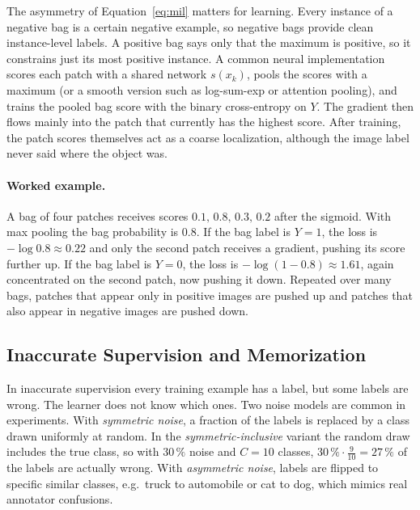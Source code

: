 \noindent
The asymmetry of Equation~\ref{eq:mil} matters for learning. Every instance
of a negative bag is a certain negative example, so negative bags provide
clean instance-level labels. A positive bag says only that the maximum is
positive, so it constrains just its most positive instance. A common neural
implementation scores each patch with a shared network $s(x_k)$, pools the
scores with a maximum (or a smooth version such as log-sum-exp or attention
pooling), and trains the pooled bag score with the binary cross-entropy on
$Y$. The gradient then flows mainly into the patch that currently has the
highest score. After training, the patch scores themselves act as a coarse
localization, although the image label never said where the object was.

\paragraph{Worked example.}
A bag of four patches receives scores $0.1,\,0.8,\,0.3,\,0.2$ after the
sigmoid. With max pooling the bag probability is $0.8$. If the bag label is
$Y=1$, the loss is $-\log0.8\approx0.22$ and only the second patch receives a
gradient, pushing its score further up. If the bag label is $Y=0$, the loss
is $-\log(1-0.8)\approx1.61$, again concentrated on the second patch, now
pushing it down. Repeated over many bags, patches that appear only in positive
images are pushed up and patches that also appear in negative images are
pushed down.

\subsection{Inaccurate Supervision and Memorization}

In inaccurate supervision every training example has a label, but some
labels are wrong. The learner does not know which ones. Two noise models are
common in experiments. With \emph{symmetric noise}, a fraction of the labels
is replaced by a class drawn uniformly at random. In the
\emph{symmetric-inclusive} variant the random draw includes the true class,
so with $30\,\%$ noise and $C=10$ classes, $30\,\%\cdot\frac{9}{10}=27\,\%$ of
the labels are actually wrong. With \emph{asymmetric noise}, labels are
flipped to specific similar classes, e.g.\ truck to automobile or cat to dog,
which mimics real annotator confusions.

